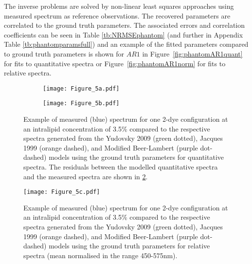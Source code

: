The inverse problems are solved by non-linear least squares  approaches using measured spectrum as reference observations. The recovered parameters are correlated to the ground truth parameters. The associated errors and correlation coefficients can be seen in Table \ref{tb:NRMSEphantom} (and further in Appendix Table \ref{tb:phantomparamsfull}) and an example of the fitted parameters compared to ground truth parameters is shown for $AR1$ in Figure~\ref{fig:phantomAR1quant} for fits to quantitative spectra or Figure~\ref{fig:phantomAR1norm} for fits to 
relative spectra.
\begin{figure}[htbp]
    \centering
    \begin{subfigure}{0.8\textwidth}
        \texttt{[image: Figure\_5a.pdf]}
        \caption{}
        \label{fig:phantomforwardsquant}
    \end{subfigure}
    \begin{subfigure}{0.8\textwidth}
        \texttt{[image: Figure\_5b.pdf]}
        \caption{}
        \label{fig:phantomresidual}
    \end{subfigure}
    \caption{Example of measured (\textcolor{MyBlue}{blue}) spectrum for one 2-dye configuration at an intralipid concentration of 3.5\% compared to the respective spectra generated from the Yudovsky 2009 (\textcolor{MyGreen}{green dotted}), Jacques 1999 (\textcolor{MyOrange}{orange dashed}), and Modified Beer-Lambert (\textcolor{MyPurple}{purple dot-dashed}) models using the ground truth parameters for quantitative spectra. 
    The residuals between the modelled quantitative spectra and the measured spectra are shown in \ref{fig:phantomresidual}.}
    \label{fig:singlegelatinforwardsrelative}
\end{figure}

\begin{figure}[htbp]
    \centering
    \texttt{[image: Figure\_5c.pdf]}
    \caption{Example of measured (\textcolor{MyBlue}{blue}) spectrum for one 2-dye configuration at an intralipid concentration of 3.5\% compared to the respective spectra generated from the Yudovsky 2009 (\textcolor{MyGreen}{green dotted}), Jacques 1999 (\textcolor{MyOrange}{orange dashed}), and Modified Beer-Lambert (\textcolor{MyPurple}{purple dot-dashed}) models using the ground truth parameters for relative spectra (mean normalised in the range 450-575nm).}
    \label{fig:phantomforwardsnorm}
\end{figure}

